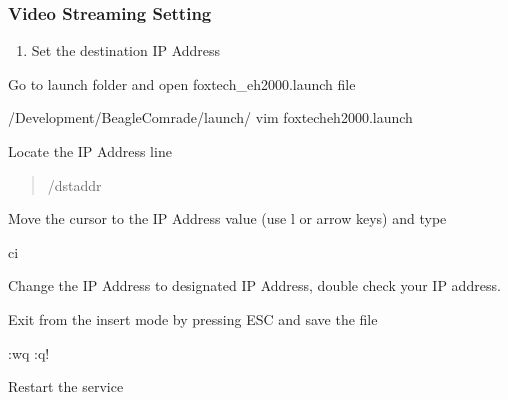 \documentclass[letterpaper,10pt,english]{sphinxmanual}
\begin{document}
\subsubsection{Video Streaming Setting}
\label{\detokenize{source/hardware/payloads/eh2000:video-streaming-setting}}\begin{enumerate}
%
\item {} 
Set the destination IP Address

\end{enumerate}

Go to launch folder and open foxtech\_eh2000.launch file

\begin{sphinxVerbatim}[commandchars=\\\{\}]
 \PYGZti{}/Development/BeagleComrade/launch/
vim foxtech\PYGZus{}eh2000.launch
\end{sphinxVerbatim}

Locate the IP Address line
\begin{quote}

\begin{sphinxVerbatim}[commandchars=\\\{\}]
/dst\PYGZus{}addr
\end{sphinxVerbatim}
\end{quote}

Move the cursor to the IP Address value (use l or arrow keys) and type

\begin{sphinxVerbatim}[commandchars=\\\{\}]
ci
\end{sphinxVerbatim}

Change the IP Address to designated IP Address, double check your IP address.

Exit from the insert mode by pressing ESC and save the file

\begin{sphinxVerbatim}[commandchars=\\\{\}]
:wq
:q!
\end{sphinxVerbatim}

Restart the service
\end{document}
